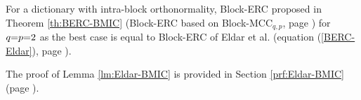 \begin{lemma}
\label{lm:Eldar-BMIC} 
For a dictionary with intra-block orthonormality, Block-ERC proposed in Theorem \ref{th:BERC-BMIC} (Block-ERC based on Block-MCC$_{q,p}$, page \pageref{th:BERC-BMIC}) for $q {=} p {=} 2$ as the best case is equal to Block-ERC of Eldar et al. (equation (\ref{BERC-Eldar}), page \pageref{BERC-Eldar}). 
\end{lemma}
The proof of Lemma \ref{lm:Eldar-BMIC} is provided in Section \ref{prf:Eldar-BMIC} (page \pageref{prf:Eldar-BMIC}).
